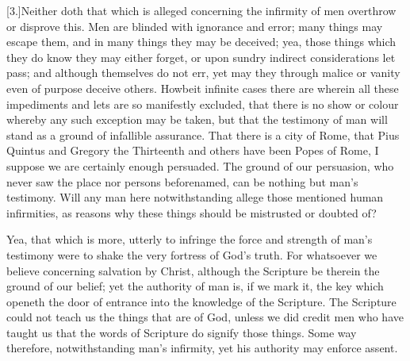 [3.]Neither doth that which is alleged concerning the infirmity of men overthrow or disprove this. Men are blinded with ignorance and error; many things may escape them, and in many things they may be deceived; yea, those things which they do know they may either forget, or upon sundry indirect considerations let pass; and although themselves do not err, yet may they through malice or vanity even of purpose deceive others. Howbeit infinite cases there are wherein all these impediments and lets are so manifestly excluded, that there is no show or colour whereby any such exception may be taken, but that the testimony of man will stand as a ground of infallible assurance. That there is a city of Rome, that Pius Quintus and Gregory the Thirteenth and others have been Popes of Rome, I suppose we are certainly enough persuaded. The ground of our persuasion, who never saw the place nor persons beforenamed, can be nothing but man’s testimony. Will any man here notwithstanding allege those  mentioned human infirmities, as reasons why these things should be mistrusted or doubted of?

Yea, that which is more, utterly to infringe the force and strength of man’s testimony were to shake the very fortress of God’s truth. For whatsoever we believe concerning salvation by Christ, although the Scripture be therein the ground of our belief; yet the authority of man is, if we mark it, the key which openeth the door of entrance into the knowledge of the Scripture. The Scripture could not teach us the things that are of God, unless we did credit men who have taught us that the words of Scripture do signify those things. Some way therefore, notwithstanding man’s infirmity, yet his authority may enforce assent.

